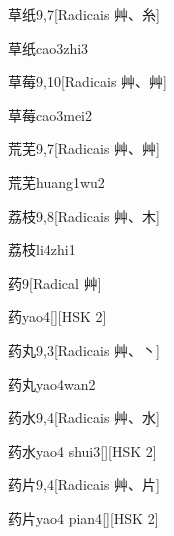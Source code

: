 \begin{entry}{草纸}{9,7}[Radicais ⾋、⽷]
  \begin{phonetics}{草纸}{cao3zhi3}
  \end{phonetics}
\end{entry}

\begin{entry}{草莓}{9,10}[Radicais ⾋、⾋]
  \begin{phonetics}{草莓}{cao3mei2}
  \end{phonetics}
\end{entry}

\begin{entry}{荒芜}{9,7}[Radicais ⾋、⾋]
  \begin{phonetics}{荒芜}{huang1wu2}
  \end{phonetics}
\end{entry}

\begin{entry}{荔枝}{9,8}[Radicais ⾋、⽊]
  \begin{phonetics}{荔枝}{li4zhi1}
  \end{phonetics}
\end{entry}

\begin{entry}{药}{9}[Radical ⾋]
  \begin{phonetics}{药}{yao4}[][HSK 2]
  \end{phonetics}
\end{entry}

\begin{entry}{药丸}{9,3}[Radicais ⾋、⼂]
  \begin{phonetics}{药丸}{yao4wan2}
  \end{phonetics}
\end{entry}

\begin{entry}{药水}{9,4}[Radicais ⾋、⽔]
  \begin{phonetics}{药水}{yao4 shui3}[][HSK 2]
  \end{phonetics}
\end{entry}

\begin{entry}{药片}{9,4}[Radicais ⾋、⽚]
  \begin{phonetics}{药片}{yao4 pian4}[][HSK 2]
  \end{phonetics}
\end{entry}

